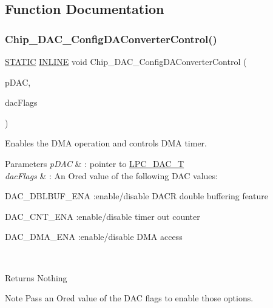 \subsection{Function Documentation}
\mbox{\label{group___d_a_c__18_x_x__43_x_x_gadd2150c87e3fc28f301417f34a5eb287}} 
\subsubsection{\texorpdfstring{Chip\+\_\+\+D\+A\+C\+\_\+\+Config\+D\+A\+Converter\+Control()}{Chip\_DAC\_ConfigDAConverterControl()}}
{\footnotesize\ttfamily \hyperlink{group___l_p_c___types___public___macros_ga10b2d890d871e1489bb02b7e70d9bdfb}{S\+T\+A\+T\+IC} \hyperlink{spifi__18xx__43xx_8h_a2eb6f9e0395b47b8d5e3eeae4fe0c116}{I\+N\+L\+I\+NE} void Chip\+\_\+\+D\+A\+C\+\_\+\+Config\+D\+A\+Converter\+Control (\begin{DoxyParamCaption}\item[{\hyperlink{struct_l_p_c___d_a_c___t}{L\+P\+C\+\_\+\+D\+A\+C\+\_\+T} $\ast$}]{p\+D\+AC,  }\item[{uint32\+\_\+t}]{dac\+Flags }\end{DoxyParamCaption})}



Enables the D\+MA operation and controls D\+MA timer. 


\begin{DoxyParams}{Parameters}
{\em p\+D\+AC} & \+: pointer to \hyperlink{struct_l_p_c___d_a_c___t}{L\+P\+C\+\_\+\+D\+A\+C\+\_\+T} \\
\hline
{\em dac\+Flags} & \+: An Or\textquotesingle{}ed value of the following D\+AC values\+:
\begin{DoxyItemize}
\item D\+A\+C\+\_\+\+D\+B\+L\+B\+U\+F\+\_\+\+E\+NA \+:enable/disable D\+A\+CR double buffering feature
\item D\+A\+C\+\_\+\+C\+N\+T\+\_\+\+E\+NA \+:enable/disable timer out counter
\item D\+A\+C\+\_\+\+D\+M\+A\+\_\+\+E\+NA \+:enable/disable D\+MA access 
\end{DoxyItemize}\\
\hline
\end{DoxyParams}
\begin{DoxyReturn}{Returns}
Nothing 
\end{DoxyReturn}
\begin{DoxyNote}{Note}
Pass an Or\textquotesingle{}ed value of the D\+AC flags to enable those options. 
\end{DoxyNote}


